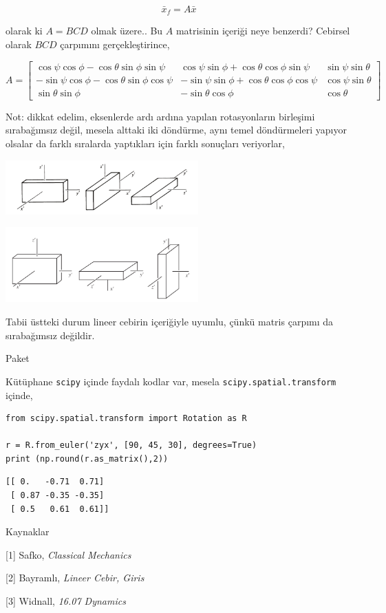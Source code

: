\documentclass[12pt,fleqn]{article}\usepackage{../../common}
\begin{document}
$$
\bar{x}_f =  A \bar{x}
$$

olarak ki $A = BCD$ olmak üzere.. Bu $A$ matrisinin içeriği neye benzerdi? Cebirsel
olarak $BCD$ çarpımını gerçekleştirince,

$$
A = \left[\begin{array}{ccc}
\cos\psi\cos\phi-\cos\theta\sin\phi\sin\psi &
\cos\psi\sin\phi + \cos\theta\cos\phi\sin\psi &
\sin\psi\sin\theta \\
-\sin\psi\cos\phi-\cos\theta\sin\phi\cos\psi &
-\sin\psi\sin\phi + \cos\theta\cos\phi\cos\psi &
\cos\psi\sin\theta \\
\sin\theta \sin\phi &
-\sin\theta\cos\phi &
\cos\theta
\end{array}\right]
$$

Not: dikkat edelim, eksenlerde ardı ardına yapılan rotasyonların birleşimi
sırabağımsız değil, mesela alttaki iki döndürme, aynı temel döndürmeleri
yapıyor olsalar da farklı sıralarda yaptıkları için farklı sonuçları veriyorlar,

\includegraphics[width=20em]{phy_072_rot_01.png}

\includegraphics[width=20em]{phy_072_rot_02.png}

Tabii üstteki durum lineer cebirin içeriğiyle uyumlu, çünkü matris çarpımı da
sırabağımsız değildir.

Paket

Kütüphane \verb!scipy! içinde faydalı kodlar var, mesela \verb!scipy.spatial.transform!
içinde,

\begin{verbatim}
from scipy.spatial.transform import Rotation as R

r = R.from_euler('zyx', [90, 45, 30], degrees=True)
print (np.round(r.as_matrix(),2))
\end{verbatim}

\begin{verbatim}
[[ 0.   -0.71  0.71]
 [ 0.87 -0.35 -0.35]
 [ 0.5   0.61  0.61]]
\end{verbatim}

Kaynaklar

[1] Safko, {\em Classical Mechanics}

[2] Bayramlı, {\em Lineer Cebir, Giris}

[3] Widnall, {\em 16.07 Dynamics}
\end{document}
